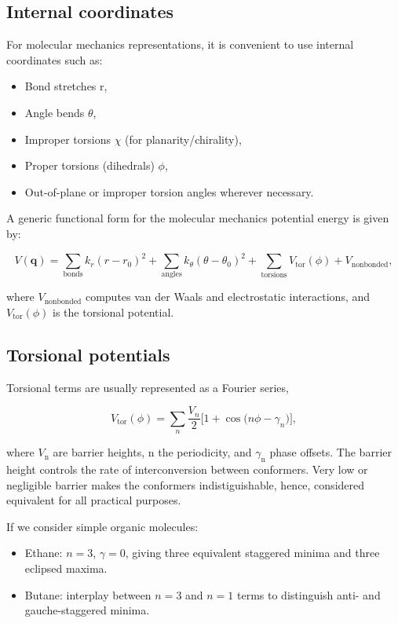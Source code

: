 \documentclass[12pt]{article}
\begin{document}
\subsection{Internal coordinates}

For molecular mechanics representations, it is convenient to use internal coordinates such as:
\begin{itemize}
  \item Bond stretches r,
  \item Angle bends $\theta$,
  \item Improper torsions $\chi$ (for planarity/chirality),
  \item Proper torsions (dihedrals) $\phi$,
  \item Out-of-plane or improper torsion angles wherever necessary.
\end{itemize}

A generic functional form for the molecular mechanics potential energy is given by:

\begin{equation}
  V(\mathbf{q}) =
  \sum_\text{bonds} k_r (r - r_0)^2 +
  \sum_\text{angles} k_\theta (\theta - \theta_0)^2 +
  \sum_\text{torsions} V_\text{tor}(\phi) +
  V_\text{nonbonded},
\end{equation}

where $V_\text{nonbonded}$ computes van der Waals and electrostatic interactions, and $V_\text{tor}(\phi)$ is the torsional potential.

\subsection{Torsional potentials}

Torsional terms are usually represented as a Fourier series,

\begin{equation}
  V_\text{tor}(\phi) =
  \sum_{n} \frac{V_n}{2}\bigl[1 + \cos\bigl(n\phi - \gamma_n\bigr)\bigr],
\end{equation}

where $V_\text{n}$ are barrier heights, n the periodicity, and $\gamma_\text{n}$ phase offsets. The barrier height controls the rate of interconversion between conformers. Very low or negligible barrier makes the conformers indistiguishable, hence, considered equivalent for all practical purposes. 

If we consider simple organic molecules:
\begin{itemize}
  \item Ethane: $n = 3$, $\gamma = 0$, giving three equivalent staggered minima and three eclipsed maxima.
  \item Butane: interplay between $n=3$ and $n=1$ terms to distinguish anti- and gauche-staggered minima.
\end{itemize}
\end{document}
